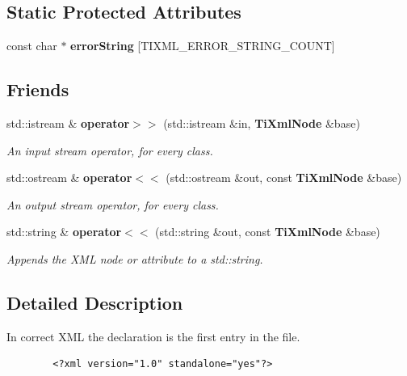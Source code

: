 \subsection*{Static Protected Attributes}
\begin{CompactItemize}
\item 
const char $\ast$ {\bf error\-String} [TIXML\_\-ERROR\_\-STRING\_\-COUNT]
\end{CompactItemize}
\subsection*{Friends}
\begin{CompactItemize}
\item 
std::istream \& {\bf operator$>$$>$} (std::istream \&in, {\bf Ti\-Xml\-Node} \&base)
\begin{CompactList}\small\item\em An input stream operator, for every class. \item\end{CompactList}\item 
std::ostream \& {\bf operator$<$$<$} (std::ostream \&out, const {\bf Ti\-Xml\-Node} \&base)
\begin{CompactList}\small\item\em An output stream operator, for every class. \item\end{CompactList}\item 
std::string \& {\bf operator$<$$<$} (std::string \&out, const {\bf Ti\-Xml\-Node} \&base)\label{classTiXmlNode_TiXmlUnknownn2}

\begin{CompactList}\small\item\em Appends the XML node or attribute to a std::string. \item\end{CompactList}\end{CompactItemize}


\subsection{Detailed Description}
In correct XML the declaration is the first entry in the file. 



\footnotesize\begin{verbatim}
		<?xml version="1.0" standalone="yes"?>
	\end{verbatim}
\normalsize


